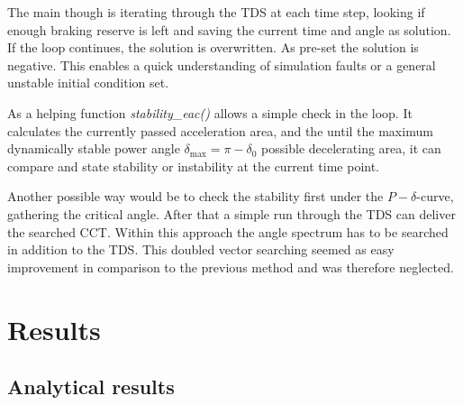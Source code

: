The main though is iterating through the \acs{TDS} at each time step, looking if enough braking reserve is left and saving the current time and angle as solution. If the loop continues, the solution is overwritten. As pre-set the solution is negative. This enables a quick understanding of simulation faults or a general unstable initial condition set.

As a helping function {\itshape stability\_eac()} allows a simple check in the loop. It calculates the currently passed acceleration area, and the until the maximum dynamically stable power angle $\delta_\mathrm{max}=\pi-\delta_\mathrm{0}$ possible decelerating area, it can compare and state stability or instability at the current time point.


Another possible way would be to check the stability first under the $P-\delta$-curve, gathering the critical angle. After that a simple run through the \acs{TDS} can deliver the searched \acs{CCT}. Within this approach the angle spectrum has to be searched in addition to the \acs{TDS}. This doubled vector searching seemed as easy improvement in comparison to the previous method and was therefore neglected.

\chapter{Results}
\label{chap:results}

\section{Analytical results}
\label{sec:analytical-results}

